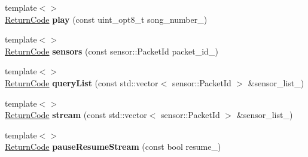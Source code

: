 \begin{DoxyCompactItemize}
\item 
\hypertarget{classroomba_1_1_open_interface_a03ecfb88dffedc5ad0ce4e39ae5e584b}{{\footnotesize template$<$$>$ }\\\hyperlink{namespaceroomba_aff53babe0af88b1ea8b066fd18b8f23f}{Return\+Code} {\bfseries play} (const uint\+\_\+opt8\+\_\+t song\+\_\+number\+\_\+)}\label{classroomba_1_1_open_interface_a03ecfb88dffedc5ad0ce4e39ae5e584b}

\item 
\hypertarget{classroomba_1_1_open_interface_ae69faf17e8c88ebc1d76de32fe7c85d7}{{\footnotesize template$<$$>$ }\\\hyperlink{namespaceroomba_aff53babe0af88b1ea8b066fd18b8f23f}{Return\+Code} {\bfseries sensors} (const sensor\+::\+Packet\+Id packet\+\_\+id\+\_\+)}\label{classroomba_1_1_open_interface_ae69faf17e8c88ebc1d76de32fe7c85d7}

\item 
\hypertarget{classroomba_1_1_open_interface_a9f59d3afd79edfb736c45d158b6d7398}{{\footnotesize template$<$$>$ }\\\hyperlink{namespaceroomba_aff53babe0af88b1ea8b066fd18b8f23f}{Return\+Code} {\bfseries query\+List} (const std\+::vector$<$ sensor\+::\+Packet\+Id $>$ \&sensor\+\_\+list\+\_\+)}\label{classroomba_1_1_open_interface_a9f59d3afd79edfb736c45d158b6d7398}

\item 
\hypertarget{classroomba_1_1_open_interface_afedf65571252548400d880f4f2aaf5da}{{\footnotesize template$<$$>$ }\\\hyperlink{namespaceroomba_aff53babe0af88b1ea8b066fd18b8f23f}{Return\+Code} {\bfseries stream} (const std\+::vector$<$ sensor\+::\+Packet\+Id $>$ \&sensor\+\_\+list\+\_\+)}\label{classroomba_1_1_open_interface_afedf65571252548400d880f4f2aaf5da}

\item 
\hypertarget{classroomba_1_1_open_interface_a724a4ce8c14a962dd402a35881cace34}{{\footnotesize template$<$$>$ }\\\hyperlink{namespaceroomba_aff53babe0af88b1ea8b066fd18b8f23f}{Return\+Code} {\bfseries pause\+Resume\+Stream} (const bool resume\+\_\+)}\label{classroomba_1_1_open_interface_a724a4ce8c14a962dd402a35881cace34}

\end{DoxyCompactItemize}
